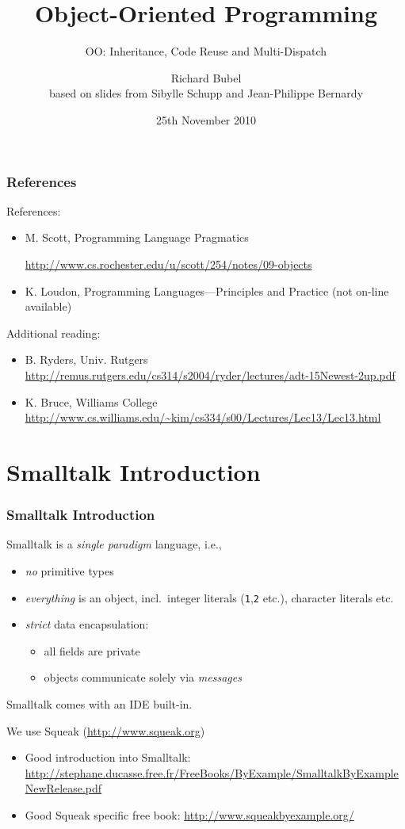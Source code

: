 \documentclass{beamer}
\title[OOP]{Object-Oriented Programming}
\subtitle[Inheritance, Reuse etc.]{OO: Inheritance, Code Reuse and Multi-Dispatch}
\author[Richard Bubel] %
{Richard Bubel \\ based on slides from Sibylle Schupp and Jean-Philippe Bernardy}
\institute[CTH]{Chalmers University of Technology}
\date{25th November 2010}%
\begin{document}
\begin{frame}
  \titlepage
\end{frame}

\begin{frame}[fragile]
\frametitle{References}
References:
\begin{itemize}
\item M. Scott, Programming Language Pragmatics

\url{http://www.cs.rochester.edu/u/scott/254/notes/09-objects}
\item K. Loudon, Programming Languages---Principles and Practice
(not on-line available)
\end{itemize}

Additional reading:
\begin{itemize}
\item B. Ryders, Univ. Rutgers
\url{
http://remus.rutgers.edu/cs314/s2004/ryder/lectures/adt-15Newest-2up.pdf
}
%
\item K. Bruce, Williams College
\url{
http://www.cs.williams.edu/~kim/cs334/s00/Lectures/Lec13/Lec13.html}
\end{itemize}
\end{frame}





\section{Smalltalk Introduction}

\begin{frame}[fragile]
\frametitle{Smalltalk Introduction}

Smalltalk is a \emph{single paradigm} language, i.e.,
\begin{itemize}
  \item \emph{no} primitive types 
  \item \emph{everything} is an object, incl.\ integer
    literals (\texttt{1},\texttt{2} etc.), character literals etc.
  \item \emph{strict} data encapsulation:
    \begin{itemize}
    \item all fields are private
    \item objects communicate solely via \emph{messages}
    \end{itemize}
\end{itemize}

\bigskip\pause

Smalltalk comes with an IDE built-in.

\bigskip

We use Squeak (\url{http://www.squeak.org})

\begin{itemize}
  \item Good introduction into Smalltalk: \url{http://stephane.ducasse.free.fr/FreeBooks/ByExample/SmalltalkByExampleNewRelease.pdf}
  \item Good Squeak specific free book: \url{http://www.squeakbyexample.org/}
\end{itemize}

\end{frame}
\end{document}
